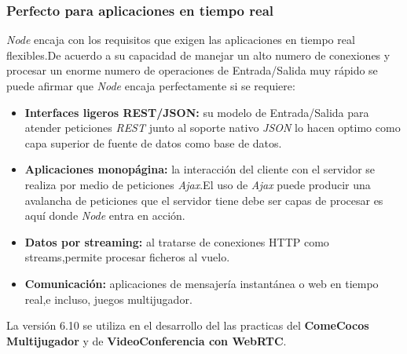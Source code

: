 \subsubsection*{Perfecto para aplicaciones en tiempo real}
\textit{Node} encaja con los requisitos que exigen las aplicaciones en tiempo real flexibles.De acuerdo a su capacidad de manejar un alto numero de conexiones y procesar un enorme numero de operaciones de Entrada/Salida muy rápido se puede afirmar que \textit{Node} encaja perfectamente si se requiere:
\begin{itemize}
\item \textbf{Interfaces ligeros REST/JSON:} su modelo de Entrada/Salida para atender peticiones \textit{REST} junto al soporte nativo \textit{JSON} lo hacen optimo como capa superior de fuente de datos como base de datos.
\item \textbf{Aplicaciones monopágina:} la interacción del cliente con el servidor se realiza por medio de peticiones \textit{Ajax}.El uso de \textit{Ajax} puede producir una avalancha de peticiones que el servidor tiene debe ser capas de procesar es aquí donde \textit{Node} entra en acción.
\item \textbf{Datos por streaming:} al tratarse de conexiones HTTP como streams,permite procesar ficheros al vuelo.
\item \textbf{Comunicación:} aplicaciones de mensajería instantánea o web en tiempo real,e incluso, juegos multijugador.
\end{itemize}
La versión 6.10 se utiliza en el desarrollo del las practicas del \textbf{ComeCocos Multijugador} y de \textbf{VideoConferencia con WebRTC}.
